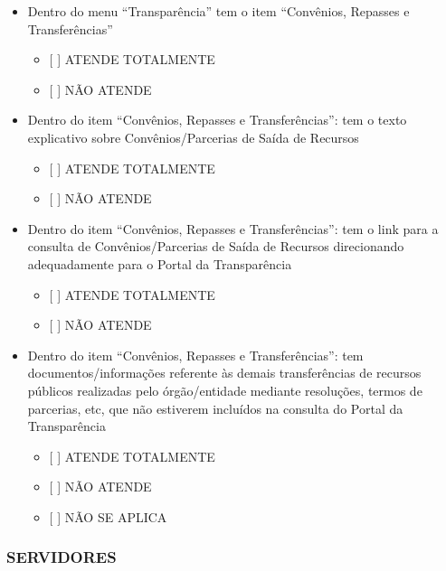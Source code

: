 \documentclass[]{book}
\providecommand{\tightlist}{%
  \setlength{\itemsep}{0pt}\setlength{\parskip}{0pt}}
\begin{document}
\begin{itemize}
\tightlist
\item
  Dentro do menu ``Transparência'' tem o item ``Convênios, Repasses e Transferências''

  \begin{itemize}
  \tightlist
  \item
    {[} {]} ATENDE TOTALMENTE
  \item
    {[} {]} NÃO ATENDE
  \end{itemize}
\item
  Dentro do item ``Convênios, Repasses e Transferências'': tem o texto explicativo sobre Convênios/Parcerias de Saída de Recursos

  \begin{itemize}
  \tightlist
  \item
    {[} {]} ATENDE TOTALMENTE
  \item
    {[} {]} NÃO ATENDE
  \end{itemize}
\item
  Dentro do item ``Convênios, Repasses e Transferências'': tem o link para a consulta de Convênios/Parcerias de Saída de Recursos direcionando adequadamente para o Portal da Transparência

  \begin{itemize}
  \tightlist
  \item
    {[} {]} ATENDE TOTALMENTE
  \item
    {[} {]} NÃO ATENDE
  \end{itemize}
\item
  Dentro do item ``Convênios, Repasses e Transferências'': tem documentos/informações referente às demais transferências de recursos públicos realizadas pelo órgão/entidade mediante resoluções, termos de parcerias, etc, que não estiverem incluídos na consulta do Portal da Transparência

  \begin{itemize}
  \tightlist
  \item
    {[} {]} ATENDE TOTALMENTE
  \item
    {[} {]} NÃO ATENDE
  \item
    {[} {]} NÃO SE APLICA
  \end{itemize}
\end{itemize}

\hypertarget{servidores-1}{%
\subsubsection*{SERVIDORES}\label{servidores-1}}
\end{document}
